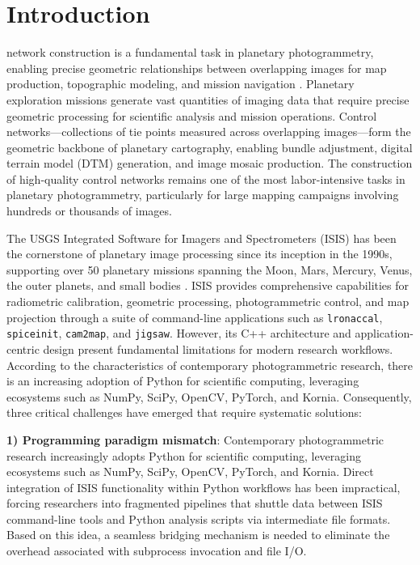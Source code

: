 \documentclass[lettersize,journal]{IEEEtran}
\begin{document}

\section{Introduction}
 network construction is a fundamental task in planetary photogrammetry, enabling precise geometric relationships between overlapping images for map production, topographic modeling, and mission navigation \cite{archinal2018iau,robinson2010lroc}. Planetary exploration missions generate vast quantities of imaging data that require precise geometric processing for scientific analysis and mission operations. Control networks—collections of tie points measured across overlapping images—form the geometric backbone of planetary cartography, enabling bundle adjustment, digital terrain model (DTM) generation, and image mosaic production. The construction of high-quality control networks remains one of the most labor-intensive tasks in planetary photogrammetry, particularly for large mapping campaigns involving hundreds or thousands of images.

The USGS Integrated Software for Imagers and Spectrometers (ISIS) has been the cornerstone of planetary image processing since its inception in the 1990s, supporting over 50 planetary missions spanning the Moon, Mars, Mercury, Venus, the outer planets, and small bodies \cite{usgs2024isis}. ISIS provides comprehensive capabilities for radiometric calibration, geometric processing, photogrammetric control, and map projection through a suite of command-line applications such as \texttt{lronaccal}, \texttt{spiceinit}, \texttt{cam2map}, and \texttt{jigsaw}. However, its C++ architecture and application-centric design present fundamental limitations for modern research workflows. According to the characteristics of contemporary photogrammetric research, there is an increasing adoption of Python for scientific computing, leveraging ecosystems such as NumPy, SciPy, OpenCV, PyTorch, and Kornia. Consequently, three critical challenges have emerged that require systematic solutions:

\textbf{1) Programming paradigm mismatch}: Contemporary photogrammetric research increasingly adopts Python for scientific computing, leveraging ecosystems such as NumPy, SciPy, OpenCV, PyTorch, and Kornia. Direct integration of ISIS functionality within Python workflows has been impractical, forcing researchers into fragmented pipelines that shuttle data between ISIS command-line tools and Python analysis scripts via intermediate file formats. Based on this idea, a seamless bridging mechanism is needed to eliminate the overhead associated with subprocess invocation and file I/O.
\end{document}

